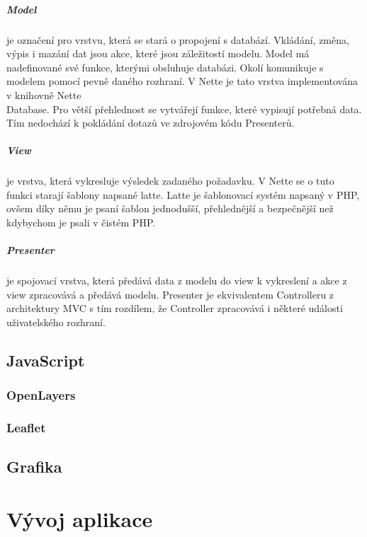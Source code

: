 \documentclass[11pt,a4paper,titlepage,oneside]{book}
\begin{document}
				\paragraph{Model} je označení pro vrstvu, která se stará o propojení s databází. Vkládání, změna, výpis i mazání dat jsou akce, které jsou záležitostí modelu. Model má nadefinované své funkce, kterými obsluhuje databázi. Okolí komunikuje s modelem pomocí pevně daného rozhraní. V Nette je tato vrstva implementována v knihovně Nette\\Database. Pro větší přehlednost se vytvářejí funkce, které vypisují potřebná data. Tím nedochází k pokládání dotazů ve zdrojovém kódu Presenterů.
				\paragraph{View} je vrstva, která vykresluje výsledek zadaného požadavku. V Nette se o tuto funkci starají šablony napsané latte. Latte je šablonovací systém napsaný v PHP, ovšem díky němu je psaní šablon jednodušší, přehlednější a bezpečnější než kdybychom je psali v čistém PHP.
				\paragraph{Presenter} je spojovací vrstva, která předává data z modelu do view k vykreslení a akce z view zpracovává a předává modelu. Presenter je ekvivalentem Controlleru z architektury MVC s tím rozdílem, že Controller zpracovává i některé události uživatelského rozhraní.
	\section{JavaScript} %
		\subsection{OpenLayers} %
		\subsection{Leaflet}
	\section{Grafika}



\chapter{Vývoj aplikace}
\end{document}
